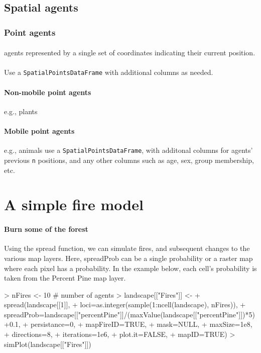 \documentclass{article}
\begin{document}
\subsection{Spatial agents}

\subsubsection{Point agents}

\paragraph{}
agents represented by a single set of coordinates indicating their current position.

\paragraph{}
Use a \texttt{SpatialPointsDataFrame} with additional columns as needed.

\paragraph{Non-mobile point agents}
e.g., plants

\paragraph{Mobile point agents}
e.g., animals use a \texttt{SpatialPointsDataFrame}, with additonal columns for agents' previous \texttt{n} positions, and any other columns such as age, sex, group membership, etc.


\paragraph{}
\section{A simple fire model}
\paragraph{Burn some of the forest}
Using the spread function, we can simulate fires, and subsequent changes to the various map layers. Here, spreadProb can be a single probability or a raster map where each pixel has a probability. In the example below, each cell's probability is taken from the Percent Pine map layer.

\begin{Schunk}
\begin{Sinput}
> nFires <- 10 # number of agents
> landscape[["Fires"]] <-
+   spread(landscape[[1]],
+          loci=as.integer(sample(1:ncell(landscape), nFires)),
+          spreadProb=landscape[["percentPine"]]/(maxValue(landscape[["percentPine"]])*5)+0.1,
+          persistance=0,
+          mapFireID=TRUE,
+          mask=NULL,
+          maxSize=1e8,
+          directions=8,
+          iterations=1e6,
+          plot.it=FALSE,
+          mapID=TRUE)
> simPlot(landscape[["Fires"]])
\end{Sinput}
\end{Schunk}
\end{document}
